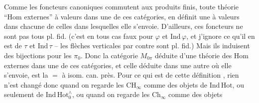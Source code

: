 Comme les foncteurs canoniques
commutent aux produits finis, toute théorie  ``Hom externes'' à valeurs dans une de ces catégories, en définit une à valeurs dans chacune de celles dans lesquelles elle s'envoie.
 D'ailleurs, ces foncteurs  ne sont pas tous pl. fid. (c'est en tous cas faux pour $\varphi$ et $\mathrm{Ind}\,\varphi$, et j'ignore ce qu'il en est de $\tau$ et $\mathrm{Ind}\,\tau$ -- les flèches verticales par contre sont pl. fid.)
Mais ils induisent des bijections pour les $\pi_0$. Donc la catégorie $M_{0\pi}$ déduite d'une théorie des Hom externes  dans une de ces catégories, et celle déduite dans une autre où elle s'envoie, est la $=$ à isom. can. près. 
Pour ce qui est de cette définition , rien n'est changé donc quand on regarde les $\mathrm{CH}_{\infty}$ comme des objets de $\mathrm{Ind}\,\mathrm{Hot}$, ou seulement de $\mathrm{Ind}\,\mathrm{Hot}_0^{\wedge}$, ou quand on regarde les $\mathrm{Ch}_{\infty}$ comme des objets

